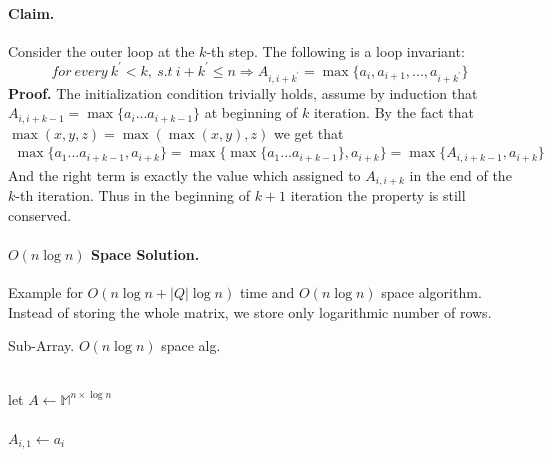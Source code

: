 \paragraph{Claim.} Consider the outer loop at the \(k\)-th step. The following is a loop invariant: \[for \ every \ k^\prime < k ,\ s.t \ i + k^\prime \le n \Rightarrow A_{i,i+k^\prime} = \max{ \{ a_{i}, a_{i+1}, ... ,a_{i + k^\prime} \} }\]  
\textbf{Proof.} The initialization condition trivially holds, assume by induction that \( A_{i,i+k-1} = \max{\{a_i ... a_{i+k-1}\}}\) at beginning of \( k \) iteration. By the fact that \( \max(x,y,z)= \max(\max(x,y),z) \) we get that
\begin{equation*}
\begin{split}
 \max{\{a_1 ... a_{i + k-1}, a_{i+ k} \}} = \max{\{ \max{ \{ a_1 ... a_{i + k-1} \} }, a_{i+ k} \}} =  \max{\{A_{i,i+k-1}, a_{i+ k} \}}
 \end{split}    
 \end{equation*} And the right term is exactly the value which assigned to \(A_{i,i+k}\) in the end of the\(k\)-th iteration. Thus in the beginning of \( k+1 \) iteration the property is still conserved.

\paragraph{ \(O\left(n\log n\right)\) Space Solution.} Example for \(O\left(n\log n + |Q|\log n\right)\) time and \(O\left(n\log n\right)\) space algorithm. Instead of storing the whole matrix, we store only logarithmic number of rows.   

\begin{algbox}{Sub-Array. \(O(n \log n )\) space alg.}
\begin{algorithm}[H]
{}
 \ \\ 
 let \(A \leftarrow \mathbb{M}^{n\times \log n} \) \\ 
 \ \\
  {
    \( A_{i,1} \leftarrow a_i\)
 }
 \ \\
\ \\
\end{algorithm}
\end{algbox}





